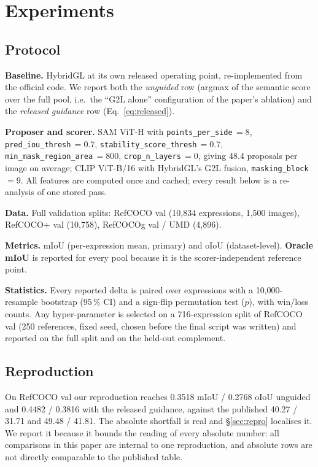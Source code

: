 \section{Experiments}
\label{sec:experiments}

\subsection{Protocol}

\textbf{Baseline.} HybridGL \cite{liu2025hybridgl} at its own released
operating point, re-implemented from the official code. We report both the
\emph{unguided} row (argmax of the semantic score over the full pool, i.e.\ the
``G2L alone'' configuration of the paper's ablation) and the \emph{released
guidance} row (Eq.~\ref{eq:released}).

\textbf{Proposer and scorer.} SAM ViT-H with
\texttt{points\_per\_side}\,$=8$, \texttt{pred\_iou\_thresh}\,$=0.7$,
\texttt{stability\_score\_thresh}\,$=0.7$, \texttt{min\_mask\_region\_area}\,$=800$,
\texttt{crop\_n\_layers}\,$=0$, giving 48.4 proposals per image on average; CLIP
ViT-B/16 with HybridGL's G2L fusion, \texttt{masking\_block}\,$=9$. All features
are computed once and cached; every result below is a re-analysis of one stored
pass.

\textbf{Data.} Full validation splits: RefCOCO val (10{,}834 expressions,
1{,}500 images), RefCOCO$+$ val (10{,}758), RefCOCOg val / UMD (4{,}896).

\textbf{Metrics.} mIoU (per-expression mean, primary) and oIoU (dataset-level).
\textbf{Oracle mIoU} is reported for every pool because it is the
scorer-independent reference point.

\textbf{Statistics.} Every reported delta is paired over expressions with a
10{,}000-resample bootstrap (95\,\% CI) and a sign-flip permutation test
($p$), with win/loss counts. Any hyper-parameter is selected on a
716-expression split of RefCOCO val (250 references, fixed seed, chosen before
the final script was written) and reported on the full split and on the
held-out complement.

\subsection{Reproduction}

On RefCOCO val our reproduction reaches 0.3518 mIoU / 0.2768 oIoU unguided and
0.4482 / 0.3816 with the released guidance, against the published 40.27 / 31.71
and 49.48 / 41.81. The absolute shortfall is real and §\ref{sec:repro}
localises it. We report it because it bounds the reading of every absolute
number: all comparisons in this paper are internal to one reproduction, and
absolute rows are not directly comparable to the published table.

